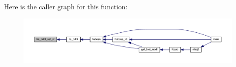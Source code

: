 Here is the caller graph for this function\+:\nopagebreak
\begin{figure}[H]
\begin{center}
\leavevmode
\includegraphics[width=350pt]{Leroi_8f90_a052539a8cd1f0d9736453c9fb65581ca_icgraph}
\end{center}
\end{figure}
\mbox{\label{Leroi_8f90_a940c66015c19ed9dab8214acf582b96c}} 
